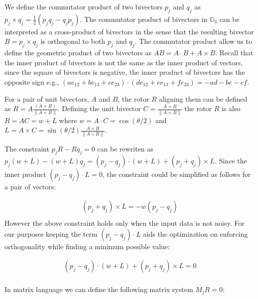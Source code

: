 \documentclass{birkjour}
\numberwithin{equation}{section}
\begin{document}
We define the commutator product of two bivectors $p_j$ and $q_j$ as $p_j \times q_j = \frac{1}{2}(p_j q_j - q_j p _j)$. The commutator product of bivectors in $\mathbb{G}_3$  can be interpreted as a cross-product of bivectors in the sense that the resulting bivector $B = p_j \times q_j$ is orthogonal to both $p_j$ and $q_j$. The commutator product allow us to define the geometric product of two bivectors as $A B = A \cdot B + A \times B$. Recall that the inner product of bivectors is not the same as the inner product of vectors, since the square of bivectors is negative, the inner product of bivectors has the opposite sign e.g., $(a e_{12} + b e_{13} + c e_{23}) \cdot (d e_{12} + e e_{13} + f e_{23}) = -a d - b e - c f$.

For a pair of unit bivectors, $A$ and $B$, the rotor $R$ aligning them can be defined as $R = A \frac{(A + B)}{\|A + B\|}$. Defining the unit bivector $C = \frac{A + B}{\|A + B\|}$ the rotor $R$ is also $R = A C = w + L$ where $w = A \cdot C = \cos(\theta/2)$ and $L = A \times C = \sin(\theta/2) \frac{A \times B}{\|A \times B\|}$.

The constraint $p_j R - R q_j = 0$ can be rewriten as $p_j (w + L) - (w + L) q_j =  (p_j - q_j) \cdot (w + L) + (p_j + q_j) \times L$. Since the inner product $(p_j - q_j) \cdot L= 0$, the constraint could be simplified as follows for a pair of vectors:

\begin{eqnarray*}
(p_j + q_j)  \times L= -w (p_j - q_j)\\
\end{eqnarray*}
However the above constraint holds only when the input data is not noisy. For our purposes keeping the term $(p_j - q_j) \cdot L$ aids the optimization on enforcing orthogonality while finding a minimum possible value:

\begin{eqnarray*}
(p_j - q_j) \cdot (w + L) + (p_j + q_j) \times L = 0\\
\end{eqnarray*}

In matrix language we can define the following matrix system $M_j R = 0$:
\end{document}
